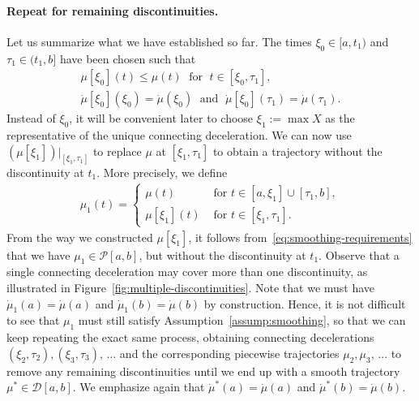 \documentclass{report}
\theoremstyle{definition}
\theoremstyle{plain}
\newcommand\halfopen[2]{\ensuremath{[#1,#2)}}
\newcommand\openhalf[2]{\ensuremath{(#1,#2]}}
\begin{document}
\paragraph{Repeat for remaining discontinuities.}
Let us summarize what we have established so far.
%
The times $\xi_{0} \in \halfopen{a}{t_{1}}$ and
$\tau_{1} \in \openhalf{t_{1}}{b}$ have been chosen such that
\begin{subequations}\label{eq:smoothing-requirements}
\begin{gather}
  \mu[\xi_{0}](t) \leq \mu(t) \; \text{ for } \; t \in [\xi_{0}, \tau_{1}] , \\
  \dot{\mu}[\xi_{0}](\xi_{0}) = \dot{\mu}(\xi_{0}) \; \text{ and } \; \dot{\mu}[\xi_{0}](\tau_{1}) = \dot{\mu}(\tau_{1}) .
\end{gather}
\end{subequations}
Instead of $\xi_{0}$, it will be convenient later to choose $\xi_{1} := \max X$
as the representative of the unique connecting deceleration.
%
We can now use $(\mu[\xi_{1}])|_{[\xi_{1},\tau_{1}]}$ to replace $\mu$ at $[\xi_{1}, \tau_{1}]$ to
obtain a trajectory without the discontinuity at $t_{1}$. More precisely, we
define
\begin{align}
  \mu_{1}(t) =
  \begin{cases}
    \mu(t) &\text{ for } t \in [a, \xi_{1}] \cup [\tau_{1}, b] , \\
    \mu[\xi_{1}](t) &\text{ for } t \in [\xi_{1}, \tau_{1}] .
  \end{cases}
\end{align}
From the way we constructed $\mu[\xi_{1}]$, it follows
from~\eqref{eq:smoothing-requirements} that we have
$\mu_{1} \in \mathcal{P}[a,b]$, but without the discontinuity at $t_{1}$.
%
Observe that a single connecting deceleration may cover more than one
discontinuity, as illustrated in Figure~\ref{fig:multiple-discontinuities}.
%
Note that we must have $\dot{\mu}_{1}(a) = \dot{\mu}(a)$ and
$\dot{\mu}_{1}(b) = \dot{\mu}(b)$ by construction.
%
Hence, it is not difficult to see that $\mu_{1}$ must still satisfy
Assumption~\ref{assump:smoothing}, so that we can keep repeating the exact same
process, obtaining connecting decelerations $(\xi_{2}, \tau_2), (\xi_{3}, \tau_{3}), \,\dots$
and the corresponding piecewise trajectories $\mu_{2}, \mu_{3}, \,\dots$ to remove any
remaining discontinuities until we end up with a smooth trajectory
$\mu^{*} \in \mathcal{D}[a,b]$.
%
We emphasize again that $\dot{\mu}^{*}(a) = \dot{\mu}(a)$ and
$\dot{\mu}^{*}(b) = \dot{\mu}(b)$.
\end{document}
